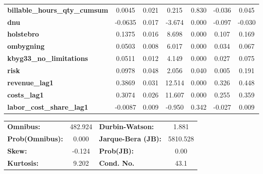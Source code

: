 \begin{center}
\begin{tabular}{lcccccc}
\textbf{billable\_hours\_qty\_cumsum}    &       0.0045  &        0.021     &     0.215  &         0.830        &       -0.036    &        0.045     \\
\textbf{dnu}                             &      -0.0635  &        0.017     &    -3.674  &         0.000        &       -0.097    &       -0.030     \\
\textbf{holstebro}                       &       0.1375  &        0.016     &     8.698  &         0.000        &        0.107    &        0.169     \\
\textbf{ombygning}                       &       0.0503  &        0.008     &     6.017  &         0.000        &        0.034    &        0.067     \\
\textbf{kbyg33\_no\_limitations}         &       0.0511  &        0.012     &     4.149  &         0.000        &        0.027    &        0.075     \\
\textbf{risk}                            &       0.0978  &        0.048     &     2.056  &         0.040        &        0.005    &        0.191     \\
\textbf{revenue\_lag1}                   &       0.3869  &        0.031     &    12.514  &         0.000        &        0.326    &        0.448     \\
\textbf{costs\_lag1}                     &       0.3074  &        0.026     &    11.607  &         0.000        &        0.255    &        0.359     \\
\textbf{labor\_cost\_share\_lag1}        &      -0.0087  &        0.009     &    -0.950  &         0.342        &       -0.027    &        0.009     \\
\bottomrule
\end{tabular}
\begin{tabular}{lclc}
\textbf{Omnibus:}       & 482.924 & \textbf{  Durbin-Watson:     } &    1.881  \\
\textbf{Prob(Omnibus):} &   0.000 & \textbf{  Jarque-Bera (JB):  } & 5810.528  \\
\textbf{Skew:}          &  -0.124 & \textbf{  Prob(JB):          } &     0.00  \\
\textbf{Kurtosis:}      &   9.202 & \textbf{  Cond. No.          } &     43.1  \\
\bottomrule
\end{tabular}
\end{center}